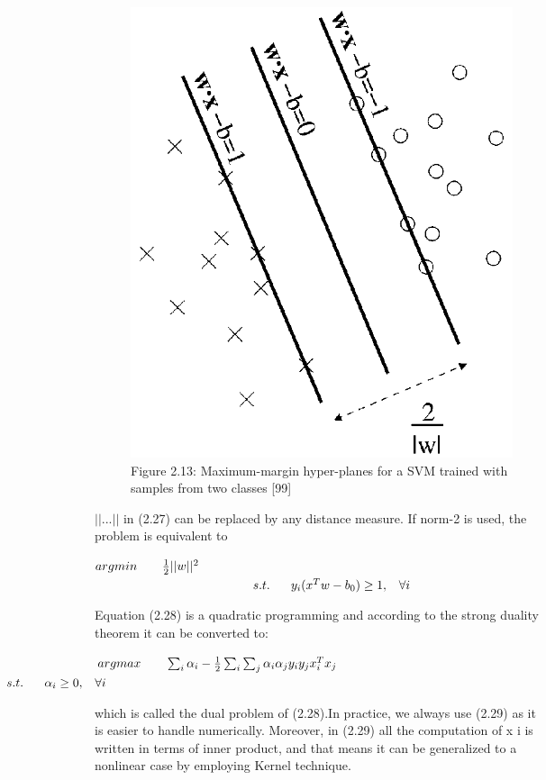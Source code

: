 \documentclass[12pt, twoside]{report}
\begin{document}
	\newpage
	\begin{figure}
		\centering \includegraphics[totalheight=8cm]{img/93_2.png}
		\caption{Figure 2.13: Maximum-margin hyper-planes for a SVM trained with samples from two classes [99]}
		\label{Fig 2.13}
	\end{figure}
	\vspace{0.5cm}
	\large{$||...||$ in (2.27) can be replaced by any distance measure. If norm-2 is used, the problem is equivalent to}
	\begin{center}
		$argmin\hspace{0.7cm}\frac{1}{2}||w||^2$\\
		$\hspace{4.4cm}s.t.\hspace{0.6cm}y_i(x^Tw-b_0)\ge1,\hspace{0.3cm}\forall i$
	\end{center}
	\large{Equation (2.28) is a quadratic programming and according to the strong duality theorem it can be converted to:}
	\begin{center}
		$argmax\hspace{0.7cm}\sum_{i}^{}\alpha_i-\frac{1}{2}\sum_{i}^{}\sum_{j}^{}\alpha_i\alpha_jy_iy_jx^T_ix_j$\\
		$\hspace{-2.5cm}s.t.\hspace{0.6cm}\alpha_i\ge0,\hspace{0.3cm}\forall i$
	\end{center}
	\large{which is called the dual problem of (2.28).In practice, we always use (2.29) as it is easier to handle numerically. Moreover, in (2.29) all the computation of x i is written in terms of inner product, and that means it can be generalized to a nonlinear case by employing Kernel technique.}
		
\end{document}
